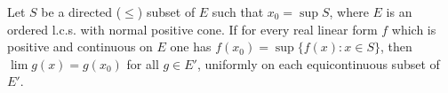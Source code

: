 Let $S$ be a directed ($\leq$) subset of $E$ such that $x_0 = \sup S$, where $E$ is an ordered l.c.s. with normal positive cone. If for every real linear form $f$ which is positive and continuous on $E$ one has $f(x_0) = \sup \{f(x) : x \in S\}$, then $\lim g(x) = g(x_0)$ for all $g \in E'$, uniformly on each equicontinuous subset of $E'$.
